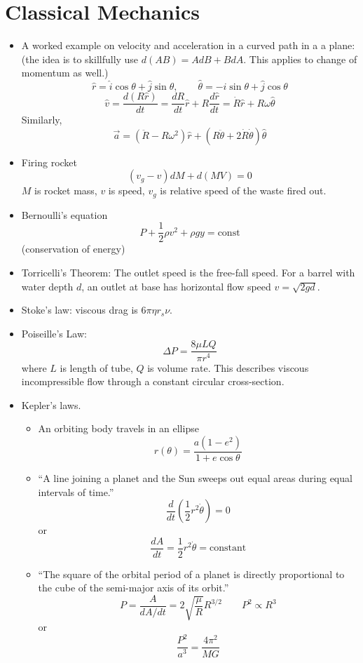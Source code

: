 \documentclass[english]{article}
\begin{document}
\section{Classical Mechanics}
\begin{itemize}
\item A worked example on velocity and acceleration in a curved path in
a a plane: (the idea is to skillfully use $d(AB)=AdB+BdA$. This applies
to change of momentum as well.)\[
\hat{r}=\hat{i}\cos\theta+\hat{j}\sin\theta,\qquad\hat{\theta}=-\hat{i}\sin\theta+\hat{j}\cos\theta\]
\[
\hat{v}=\frac{d(R\hat{r})}{dt}=\frac{dR}{dt}\hat{r}+R\frac{d\hat{r}}{dt}=\dot{R}\hat{r}+R\omega\hat{\theta}\]
Similarly, \[
\vec{a}=(\ddot{R}-R\omega^{2})\hat{r}+(R\ddot{\theta}+2\dot{R}\dot{\theta})\hat{\theta}\]

\item Firing rocket\[
(v_{g}-v)dM+d(MV)=0\]
$M$ is rocket mass, $v$ is speed, $v_{g}$ is relative speed of
the waste fired out.
\item Bernoulli's equation\[
P+\frac{1}{2}\rho v^{2}+\rho gy=\text{const}\]
(conservation of energy)
\item Torricelli's Theorem: The outlet speed is the free-fall speed. For
a barrel with water depth $d$, an outlet at base has horizontal flow
speed $v=\sqrt{2gd}$.
\item Stoke's law: viscous drag is $6\pi\eta r_{s}\nu$.
\item Poiseille's Law:\[
\Delta P=\frac{8\mu LQ}{\pi r^{4}}\]
where $L$ is length of tube, $Q$ is volume rate. This describes
viscous incompressible flow through a constant circular cross-section.
\item Kepler's laws.

\begin{itemize}
\item An orbiting body travels in an ellipse\[
r(\theta)=\frac{a(1-e^{2})}{1+e\cos\theta}\]

\item {}``A line joining a planet and the Sun sweeps out equal areas during
equal intervals of time.''\[
\frac{d}{dt}\left(\frac{1}{2}r^{2}\dot{\theta}\right)=0\]
or\[
\frac{dA}{dt}=\frac{1}{2}r^{2}\dot{\theta}=\text{constant}\]

\item {}``The square of the orbital period of a planet is directly proportional
to the cube of the semi-major axis of its orbit.''\[
P=\frac{A}{dA/dt}=2\sqrt{\frac{\mu}{R}}R^{3/2}\qquad P^{2}\propto R^{3}\]
or \[
\frac{P^{2}}{a^{3}}=\frac{4\pi^{2}}{MG}\]


\end{itemize}
\end{itemize}
\end{document}
